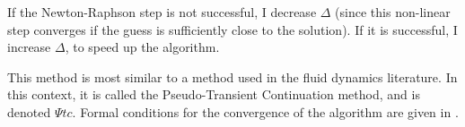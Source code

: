 \documentclass[english]{article}
\begin{document}
	If the Newton-Raphson step is not successful, I decrease $\Delta$ (since this non-linear step converges if the guess is sufficiently close to the solution). If it is successful, I increase $\Delta$, to speed up the algorithm.

	This method is most similar to a method used in the fluid dynamics literature. In this context, it is called the Pseudo-Transient Continuation method, and is denoted $\Psi tc$. Formal conditions for the convergence of the algorithm are given in  \citet{kelley1998convergence}.\par



		
	
	
\end{document}
